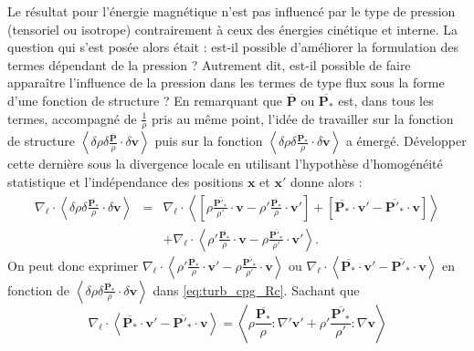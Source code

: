 Le résultat pour l'énergie magnétique n'est pas influencé par le type de pression (tensoriel ou isotrope) contrairement à ceux des énergies cinétique et interne. La question qui s'est posée alors était : est-il possible d'améliorer la formulation des termes dépendant de la pression ? Autrement dit, est-il possible de faire apparaître l'influence de la pression dans les termes de type flux sous la forme d'une fonction de structure ?
 En remarquant que $\overline{\boldsymbol{P}}$ ou $\overline{\boldsymbol{P_*}}$ est, dans tous les termes, accompagné de $\frac{1}{\rho}$ pris au même point, l'idée de travailler sur la fonction de structure $\left<\delta \rho \delta \frac{ \overline{\boldsymbol{P}}}{\rho} \cdot \delta \boldsymbol{v} \right>$ puis sur la fonction $\left<\delta \rho \delta \frac{ \overline{\boldsymbol{P_*}} }{\rho} \cdot\delta \boldsymbol{v} \right>$ a émergé. Développer cette dernière sous la divergence locale en utilisant l'hypothèse d'homogénéité statistique et l'indépendance des positions $\boldsymbol{x}$ et  $\boldsymbol{x'}$ donne alors : 
\begin{eqnarray*}
    \nabla_{\boldsymbol{\ell}} \cdot \left<\delta \rho \delta \frac{ \overline{\boldsymbol{P_*}} }{\rho}  \cdot\delta \boldsymbol{v} \right> &=& \nabla_{\boldsymbol{\ell}} \cdot \left< \left[\rho  \frac{ \overline{\boldsymbol{P'_*}} }{\rho'}   \cdot\boldsymbol{v}  -\rho'  \frac{ \overline{\boldsymbol{P_*}} }{\rho} \cdot \boldsymbol{v'}\right] +  \left[\overline{\boldsymbol{P_*}} \cdot \boldsymbol{v'} - \overline{\boldsymbol{P'_*}}    \cdot\boldsymbol{v} \right] \right> \\
    &&+\nabla_{\boldsymbol{\ell}} \cdot \left<\rho'  \frac{ \overline{\boldsymbol{P_*}} }{\rho} \cdot \boldsymbol{v} - \rho  \frac{ \overline{\boldsymbol{P'_*}} }{\rho'}  \cdot \boldsymbol{v'}  \right> .
\end{eqnarray*}
 On peut donc exprimer $ \nabla_{\boldsymbol{\ell}} \cdot \left< \rho' \frac{ \overline{\boldsymbol{P_*}}}{\rho} \cdot \boldsymbol{v'} -  \rho \frac{\overline{\boldsymbol{P'_*}}}{\rho'} \cdot \boldsymbol{v} \right>$ ou $ \nabla_{\boldsymbol{\ell}} \cdot \left<  \overline{\boldsymbol{P_*}} \cdot \boldsymbol{v'} -  \overline{\boldsymbol{P'_*}} \cdot \boldsymbol{v} \right>$ en fonction de $\left<\delta \rho \delta \frac{ \overline{\boldsymbol{P_*}} }{\rho} \cdot\delta \boldsymbol{v} \right>$ dans \eqref{eq:turb_cpg_Rc}. Sachant que 
 \begin{equation*}
  \nabla_{\boldsymbol{\ell}} \cdot \left<  \overline{\boldsymbol{P_*}} \cdot \boldsymbol{v'} -  \overline{\boldsymbol{P'_*}} \cdot \boldsymbol{v} \right> = \left<  \rho  \frac{ \overline{\boldsymbol{P_*}} }{\rho} : \nabla'\boldsymbol{v'} +   \rho'\frac{ \overline{\boldsymbol{P'_*}} }{\rho'} : \nabla \boldsymbol{v} \right>
 \end{equation*}

